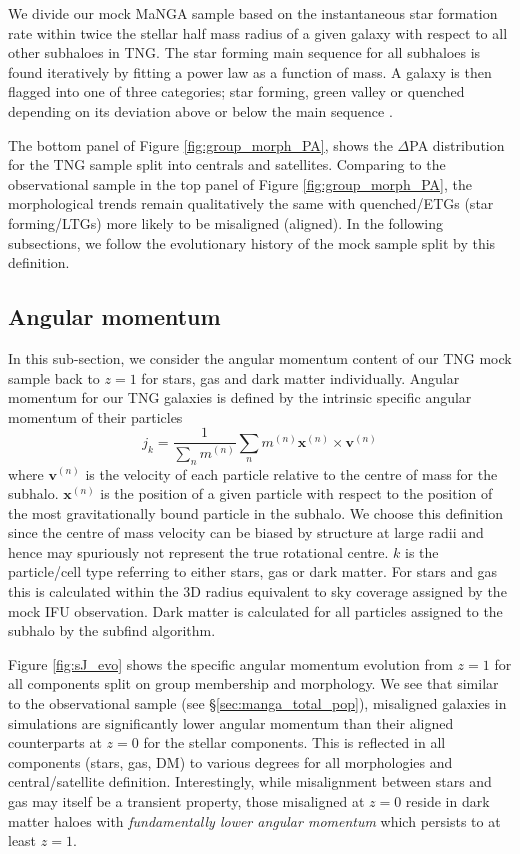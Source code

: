 \documentclass[fleqn,usenatbib]{mnras}
\begin{document}
We divide our mock MaNGA sample based on the instantaneous star formation rate within twice the stellar half mass radius of a given galaxy with respect to all other subhaloes in TNG. The star forming main sequence for all subhaloes is found iteratively by fitting a power law as a function of mass. A galaxy is then flagged into one of three categories; star forming, green valley or quenched depending on its deviation above or below the main sequence \citep{pillepich2019}. 

The bottom panel of Figure \ref{fig:group_morph_PA}, shows the $\Delta$PA distribution for the TNG sample split into centrals and satellites. Comparing to the observational sample in the top panel of Figure \ref{fig:group_morph_PA}, the morphological trends remain qualitatively the same with quenched/ETGs (star forming/LTGs) more likely to be misaligned (aligned). In the following subsections, we follow the evolutionary history of the mock sample split by this definition. 

\subsection{Angular momentum}
In this sub-section, we consider the angular momentum content of our TNG mock sample back to $z=1$ for stars, gas and dark matter individually. Angular momentum for our TNG galaxies is defined by the intrinsic specific angular momentum of their particles
\begin{equation}
j_{k} = \frac{1}{\sum_{n} m^{(n)}} \sum_{n} m^{(n)}\boldsymbol{x}^{(n)} \times \boldsymbol{v}^{(n)}
\end{equation}
where $\boldsymbol{v}^{(n)}$ is the velocity of each particle relative to the centre of mass for the subhalo. $\boldsymbol{x}^{(n)}$ is the position of a given particle with respect to the position of the most gravitationally bound particle in the subhalo. We choose this definition since the centre of mass velocity can be biased by structure at large radii and hence may spuriously not represent the true rotational centre. $k$ is the particle/cell type referring to either stars, gas or dark matter. For stars and gas this is calculated within the 3D radius equivalent to sky coverage assigned by the mock IFU observation. Dark matter is calculated for all particles assigned to the subhalo by the subfind algorithm. 

Figure \ref{fig:sJ_evo} shows the specific angular momentum evolution from $z=1$ for all components split on group membership and morphology. We see that similar to the observational sample (see \S\ref{sec:manga_total_pop}), misaligned galaxies in simulations are significantly lower angular momentum than their aligned counterparts at $z=0$ for the stellar components. This is reflected in all components (stars, gas, DM) to various degrees for all morphologies and central/satellite definition. Interestingly, while misalignment between stars and gas may itself be a transient property, those misaligned at $z = 0$ reside in dark matter haloes with \textit{fundamentally lower angular momentum} which persists to at least $z = 1$. 
\end{document}
